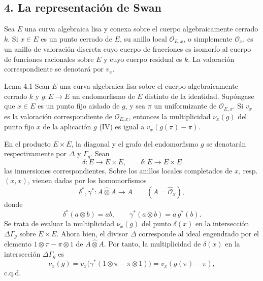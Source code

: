 \subsection*{4. La representación de Swan}

Sea $E$ una curva algebraica lisa y conexa sobre el cuerpo algebraicamente cerrado $k$. Si $x\in E$ es un punto cerrado de $E$, su anillo local $\mathcal O_{E,x}$, o simplemente $\mathcal O_x$, es un anillo de valoración discreta cuyo cuerpo de fracciones es isomorfo al cuerpo de funciones racionales sobre $E$ y cuyo cuerpo residual es $k$. La valoración correspondiente se denotará por $v_x$.

\begin{statement}{Lema 4.1}
Sean $E$ una curva algebraica lisa sobre el cuerpo algebraicamente cerrado $k$ y $g:E\to E$ un endomorfismo de $E$ distinto de la identidad. Supóngase que $x\in E$ es un punto fijo aislado de $g$, y sea $\pi$ un uniformizante de $\mathcal O_{E,x}$. Si $v_x$ es la valoración correspondiente de $\mathcal O_{E,x}$, entonces la multiplicidad $\nu_x(g)$ del punto fijo $x$ de la aplicación $g$ (IV) es igual a $v_x(g(\pi)-\pi)$.
\end{statement}


En el producto $E\times E$, la diagonal y el grafo del endomorfismo $g$ se denotarán respectivamente por $\Delta$ y $\Gamma_g$. Sean
\[
\delta:E\longrightarrow E\times E,\qquad
\delta:E\longrightarrow E\times E
\]
las inmersiones correspondientes. Sobre los anillos locales completados de $x$, resp. $(x,x)$, vienen dadas por los homomorfismos
\[
\delta^*,\gamma^*:A\widehat\otimes A\longrightarrow A
\qquad (A=\widehat{\mathcal O}_x),
\]
donde
\[
\delta^*(a\otimes b)=ab,\qquad
\gamma^*(a\otimes b)=a\,g^*(b).
\]
Se trata de evaluar la multiplicidad $\nu_x(g)$ del punto $\delta(x)$ en la intersección $\Delta\Gamma_g$ sobre $E\times E$. Ahora bien, el divisor $\Delta$ corresponde al ideal engendrado por el elemento $1\otimes\pi-\pi\otimes1$ de $A\widehat\otimes A$. Por tanto, la multiplicidad de $\delta(x)$ en la intersección $\Delta\Gamma_g$ es
\[
\nu_x(g)=v_x\bigl(\gamma^*(1\otimes\pi-\pi\otimes1)\bigr)
      =v_x(g(\pi)-\pi),
\]
c.q.d.
